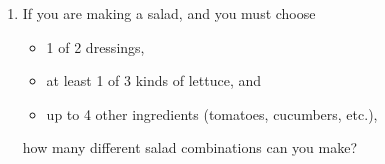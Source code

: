 \documentclass{article}
\begin{document}
\begin{enumerate}
\item If you are making a salad, and you must choose\marginpar{[2]}
	\begin{itemize}
	\item 1 of 2 dressings,
	\item at least 1 of 3 kinds of lettuce, and
	\item up to 4 other ingredients (tomatoes, cucumbers, etc.),
	\end{itemize}
how many different salad combinations can you make?
\end{enumerate}
\hrulefill\\
\label{end}
\end{document}

